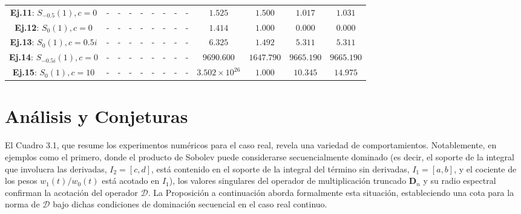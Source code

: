 \begin{table}
\begin{tabular}{|c|cccc|cccc|cccc|}
		\textbf{Ej.11}: $S_{-0.5}(1), c=0$       & -                                             & -                                                & -                                   & -        & -                      & -              & -                       & -        & $1.525$                & $1.500$        & $1.017$                 & $1.031$    \\
		\textbf{Ej.12}: $S_{0}(1), c=0$          & -                                             & -                                                & -                                   & -        & -                      & -              & -                       & -        & $1.414$                & $1.000$        & $0.000$                 & $0.000$    \\
		\textbf{Ej.13}: $S_{0}(1), c=0.5i$       & -                                             & -                                                & -                                   & -        & -                      & -              & -                       & -        & $6.325$                & $1.492$        & $5.311$                 & $5.311$    \\
		\textbf{Ej.14}: $S_{-0.5i}(1), c=0$      & -                                             & -                                                & -                                   & -        & -                      & -              & -                       & -        & $9690.600$             & $1647.790$     & $9665.190$              & $9665.190$ \\
		\textbf{Ej.15}: $S_{0}(1), c=10$         & -                                             & -                                                & -                                   & -        & -                      & -              & -                       & -        & $3.502 \times 10^{26}$ & $1.000$        & $10.345$                & $14.975$   \\
		\hline
	\end{tabular}
\end{table}

\newpage

\section{Análisis y Conjeturas}

El Cuadro 3.1, que resume los experimentos numéricos para el caso real, revela una variedad de comportamientos. Notablemente, en ejemplos como el primero, donde el producto de Sobolev puede considerarse secuencialmente dominado (es decir, el soporte de la integral que involucra las derivadas, $I_2=[c,d]$, está contenido en el soporte de la integral del término sin derivadas, $I_1=[a,b]$, y el cociente de los pesos $w_1(t)/w_0(t)$ está acotado en $I_1$), los valores singulares del operador de multiplicación truncado $\mathbf{D}_n$ y su radio espectral confirman la acotación del operador $\mathcal{D}$. La Proposición a continuación aborda formalmente esta situación, estableciendo una cota para la norma de $\mathcal{D}$ bajo dichas condiciones de dominación secuencial en el caso real continuo.

